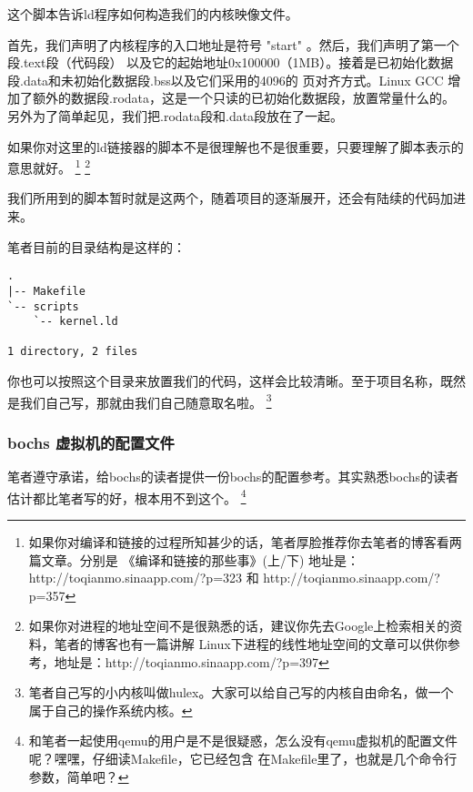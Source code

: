 \par 这个脚本告诉ld程序如何构造我们的内核映像文件。
\par 首先，我们声明了内核程序的入口地址是符号 "start" 。然后，我们声明了第一个段.text段（代码段）\allowbreak
以及它的起始地址0x100000（1MB）。接着是已初始化数据段.data和未初始化数据段.bss以及它们采用的4096的\allowbreak
页对齐方式。Linux GCC 增加了额外的数据段.rodata，这是一个只读的已初始化数据段，放置常量什么的。\allowbreak
另外为了简单起见，我们把.rodata段和.data段放在了一起。
\par 如果你对这里的ld链接器的脚本不是很理解也不是很重要，只要理解了脚本表示的意思就好。
\footnote{如果你对编译和链接的过程所知甚少的话，笔者厚脸推荐你去笔者的博客看两篇文章。分别是\allowbreak
《编译和链接的那些事》(上/下) 地址是：http://toqianmo.sinaapp.com/?p=323 和 \allowbreak
http://toqianmo.sinaapp.com/?p=357}
\footnote{如果你对进程的地址空间不是很熟悉的话，建议你先去Google上检索相关的资料，笔者的博客也有一篇讲解\allowbreak
Linux下进程的线性地址空间的文章可以供你参考，地址是：http://toqianmo.sinaapp.com/?p=397}
\par 我们所用到的脚本暂时就是这两个，随着项目的逐渐展开，还会有陆续的代码加进来。
\par 笔者目前的目录结构是这样的：
\begin{Verbatim}[frame=single]
.
|-- Makefile
`-- scripts
    `-- kernel.ld

1 directory, 2 files
\end{Verbatim}
\par 你也可以按照这个目录来放置我们的代码，这样会比较清晰。至于项目名称，既然是我们自己写，那就由我们自己随意取名啦。
\footnote{笔者自己写的小内核叫做hulex。大家可以给自己写的内核自由命名，做一个属于自己的操作系统内核。}

\subsubsection{bochs 虚拟机的配置文件}
\par 笔者遵守承诺，给bochs的读者提供一份bochs的配置参考。其实熟悉bochs的读者估计都比笔者写的好，根本用不到这个。
\footnote{和笔者一起使用qemu的用户是不是很疑惑，怎么没有qemu虚拟机的配置文件呢？嘿嘿，仔细读Makefile，它已经包含\allowbreak
在Makefile里了，也就是几个命令行参数，简单吧？}

